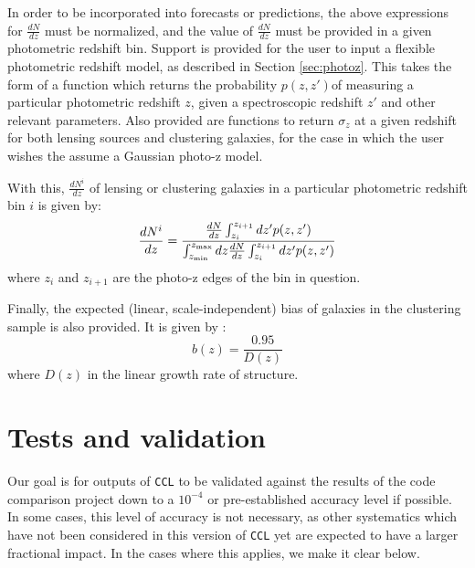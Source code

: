 \documentclass[\docopts]{\docclass}
\begin{document}
In order to be incorporated into forecasts or predictions, the above expressions for $\frac{dN}{dz}$ must be normalized, and the value of $\frac{dN}{dz}$ must be provided in a given photometric redshift bin. Support is provided for the user to input a flexible photometric redshift model, as described in Section \ref{sec:photoz}. This takes the form of a function which returns the probability $p(z,z')$of measuring a particular photometric redshift $z$, given a spectroscopic redshift $z'$ and other relevant parameters. Also provided are functions to return $\sigma_z$ at a given redshift for both lensing sources and clustering galaxies, for the case in which the user wishes the assume a Gaussian photo-z model.

With this, $\frac{dN^i}{dz}$ of lensing or clustering galaxies in a particular photometric redshift bin $i$ is given by:
\begin{equation}
\frac{dN^i}{dz} = \frac{\frac{dN}{dz}\int_{z_i}^{z_{i+1}} dz' p(z,z')}{\int_{z_{\rm min}}^{z_{\rm max}}dz \frac{dN}{dz} \int_{z_i}^{z_{i+1}}dz' p(z, z')}
\label{photoz}
\end{equation}
where $z_{i}$ and $z_{i+1}$ are the photo-z edges of the bin in question.

Finally, the expected (linear, scale-independent) bias of galaxies in the clustering sample is also provided. It is given by \cite{ScienceBook}:
\begin{equation}
b(z) = \frac{0.95}{D(z)}
\label{clustbias}
\end{equation}
where $D(z)$ in the linear growth rate of structure.

\section{Tests and validation}
\label{sec:tests}

Our goal is for outputs of {\tt CCL} to be validated against the results of the code comparison project down to a $10^{-4}$ or pre-established accuracy level if possible. In some cases, this level of accuracy is not necessary, as other systematics which have not been considered in this version of {\tt CCL} yet are expected to have a larger fractional impact. In the cases where this applies, we make it clear below.
\end{document}
